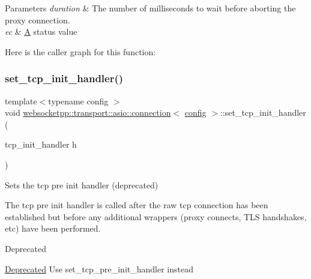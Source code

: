 \begin{DoxyParams}{Parameters}
{\em duration} & The number of milliseconds to wait before aborting the proxy connection.\\
\hline
{\em ec} & \mbox{\hyperlink{struct_a}{A}} status value \\
\hline
\end{DoxyParams}
Here is the caller graph for this function\+:
\mbox{\label{classwebsocketpp_1_1transport_1_1asio_1_1connection_abb0254e3207691c45c9ca7061352a90a}} 
\subsubsection{\texorpdfstring{set\+\_\+tcp\+\_\+init\+\_\+handler()}{set\_tcp\_init\_handler()}}
{\footnotesize\ttfamily template$<$typename config $>$ \\
void \mbox{\hyperlink{classwebsocketpp_1_1transport_1_1asio_1_1connection}{websocketpp\+::transport\+::asio\+::connection}}$<$ \mbox{\hyperlink{classconfig}{config}} $>$\+::set\+\_\+tcp\+\_\+init\+\_\+handler (\begin{DoxyParamCaption}\item[{tcp\+\_\+init\+\_\+handler}]{h }\end{DoxyParamCaption})\hspace{0.3cm}{\ttfamily [inline]}}



Sets the tcp pre init handler (deprecated) 

The tcp pre init handler is called after the raw tcp connection has been established but before any additional wrappers (proxy connects, T\+LS handshakes, etc) have been performed.

\begin{DoxyRefDesc}{Deprecated}
\item[\mbox{\hyperlink{deprecated__deprecated000002}{Deprecated}}]Use set\+\_\+tcp\+\_\+pre\+\_\+init\+\_\+handler instead\end{DoxyRefDesc}



